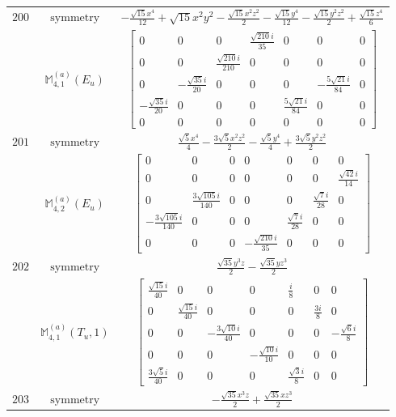 \documentclass[fleqn,8pt,landscape]{jsarticle}
\begin{document}
\begin{longtable}{ccc}
$ 200 $ & $ \text{symmetry} $ & $ - \frac{\sqrt{15} x^{4}}{12} + \sqrt{15} x^{2} y^{2} - \frac{\sqrt{15} x^{2} z^{2}}{2} - \frac{\sqrt{15} y^{4}}{12} - \frac{\sqrt{15} y^{2} z^{2}}{2} + \frac{\sqrt{15} z^{4}}{6} $ \\
$  $ & $ \mathbb{M}_{4,1}^{(a)}(E_{u}) $ & $ \begin{bmatrix} 0 & 0 & 0 & \frac{\sqrt{210} i}{35} & 0 & 0 & 0 \\ 0 & 0 & \frac{\sqrt{210} i}{210} & 0 & 0 & 0 & 0 \\ 0 & - \frac{\sqrt{35} i}{20} & 0 & 0 & 0 & - \frac{5 \sqrt{21} i}{84} & 0 \\ - \frac{\sqrt{35} i}{20} & 0 & 0 & 0 & \frac{5 \sqrt{21} i}{84} & 0 & 0 \\ 0 & 0 & 0 & 0 & 0 & 0 & 0 \end{bmatrix} $ \\ \hline
$ 201 $ & $ \text{symmetry} $ & $ \frac{\sqrt{5} x^{4}}{4} - \frac{3 \sqrt{5} x^{2} z^{2}}{2} - \frac{\sqrt{5} y^{4}}{4} + \frac{3 \sqrt{5} y^{2} z^{2}}{2} $ \\
$  $ & $ \mathbb{M}_{4,2}^{(a)}(E_{u}) $ & $ \begin{bmatrix} 0 & 0 & 0 & 0 & 0 & 0 & 0 \\ 0 & 0 & 0 & 0 & 0 & 0 & \frac{\sqrt{42} i}{14} \\ 0 & \frac{3 \sqrt{105} i}{140} & 0 & 0 & 0 & \frac{\sqrt{7} i}{28} & 0 \\ - \frac{3 \sqrt{105} i}{140} & 0 & 0 & 0 & \frac{\sqrt{7} i}{28} & 0 & 0 \\ 0 & 0 & 0 & - \frac{\sqrt{210} i}{35} & 0 & 0 & 0 \end{bmatrix} $ \\ \hline
$ 202 $ & $ \text{symmetry} $ & $ \frac{\sqrt{35} y^{3} z}{2} - \frac{\sqrt{35} y z^{3}}{2} $ \\
$  $ & $ \mathbb{M}_{4,1}^{(a)}(T_{u},1) $ & $ \begin{bmatrix} \frac{\sqrt{15} i}{40} & 0 & 0 & 0 & \frac{i}{8} & 0 & 0 \\ 0 & \frac{\sqrt{15} i}{40} & 0 & 0 & 0 & \frac{3 i}{8} & 0 \\ 0 & 0 & - \frac{3 \sqrt{10} i}{40} & 0 & 0 & 0 & - \frac{\sqrt{6} i}{8} \\ 0 & 0 & 0 & - \frac{\sqrt{10} i}{10} & 0 & 0 & 0 \\ \frac{3 \sqrt{5} i}{40} & 0 & 0 & 0 & \frac{\sqrt{3} i}{8} & 0 & 0 \end{bmatrix} $ \\ \hline
$ 203 $ & $ \text{symmetry} $ & $ - \frac{\sqrt{35} x^{3} z}{2} + \frac{\sqrt{35} x z^{3}}{2} $ \\

\end{longtable}
\end{document}
